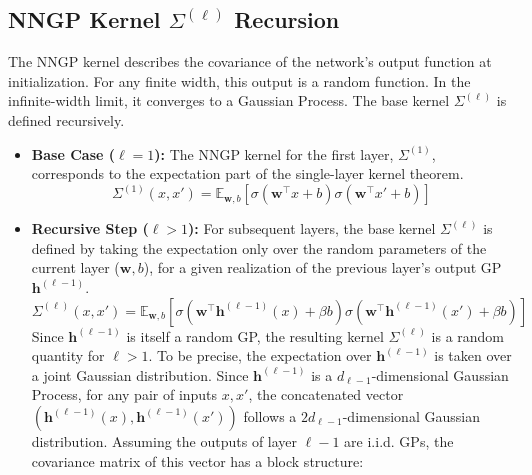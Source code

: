 \documentclass[12pt]{article}
\begin{document}
\subsection{NNGP Kernel \(\Sigma^{(\ell)}\) Recursion}
The NNGP kernel describes the covariance of the network's output function at initialization. For any finite width, this output is a random function. In the infinite-width limit, it converges to a Gaussian Process. The base kernel $\Sigma^{(\ell)}$ is defined recursively.
\begin{itemize}
    \item \textbf{Base Case (\(\ell=1\)):} The NNGP kernel for the first layer, $\Sigma^{(1)}$, corresponds to the expectation part of the single-layer kernel theorem.
    \begin{equation}
        \Sigma^{(1)}(x, x') = \mathbb{E}_{\bm{w},b}\left[\sigma(\bm{w}^\top x + b)\sigma(\bm{w}^\top x' + b)\right]
    \end{equation}
    
    \item \textbf{Recursive Step (\(\ell > 1\)):} For subsequent layers, the base kernel $\Sigma^{(\ell)}$ is defined by taking the expectation only over the random parameters of the current layer ($\bm{w}, b$), for a given realization of the previous layer's output GP $\bm{h}^{(\ell-1)}$.
    \begin{equation}
        \Sigma^{(\ell)}(x, x') = \mathbb{E}_{\bm{w}, b} \left[ \sigma\left(\bm{w}^\top \bm{h}^{(\ell-1)}(x) + \beta b\right) \sigma\left(\bm{w}^\top \bm{h}^{(\ell-1)}(x') + \beta b\right) \right]
    \end{equation}
    Since $\bm{h}^{(\ell-1)}$ is itself a random GP, the resulting kernel $\Sigma^{(\ell)}$ is a random quantity for $\ell > 1$.
    To be precise, the expectation over $\bm{h}^{(\ell-1)}$ is taken over a joint Gaussian distribution. Since $\bm{h}^{(\ell-1)}$ is a $d_{\ell-1}$-dimensional Gaussian Process, for any pair of inputs $x, x'$, the concatenated vector $(\bm{h}^{(\ell-1)}(x), \bm{h}^{(\ell-1)}(x'))$ follows a $2d_{\ell-1}$-dimensional Gaussian distribution. Assuming the outputs of layer $\ell-1$ are i.i.d. GPs, the covariance matrix of this vector has a block structure:
\end{itemize}
\end{document}
